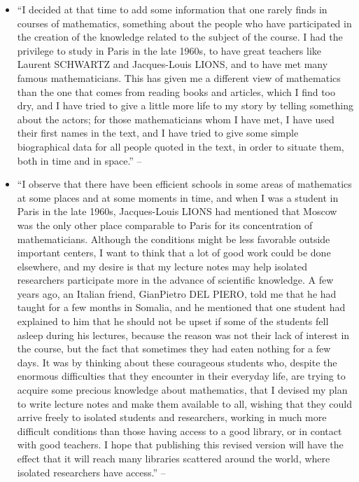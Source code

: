 \documentclass[oneside]{book}
\numberwithin{equation}{section}
\begin{document}
\begin{enumerate}
\begin{itemize}
		\item ``I decided at that time to add some information that one rarely finds in courses of mathematics, something about the people who have participated in the creation of the knowledge related to the subject of the course. I had the privilege to study in Paris in the late 1960s, to have great teachers like Laurent SCHWARTZ and Jacques-Louis LIONS, and to have met many famous mathematicians. This has given me a different view of mathematics than the one that comes from reading books and articles, which I find too dry, and I have tried to give a little more life to my story by telling something about the actors; for those mathematicians whom I have met, I have used their first names in the text, and I have tried to give some simple biographical data for all people quoted in the text, in order to situate them, both in time and in space.'' -- \cite[Preface, p. x]{Tartar2006}
		\item ``I observe that there have been efficient schools in some areas of mathematics at some places and at some moments in time, and when I was a student in Paris in the late 1960s, Jacques-Louis LIONS had mentioned that Moscow was the only other place comparable to Paris for its concentration of mathematicians. Although the conditions might be less favorable outside important centers, I want to think that a lot of good work could be done elsewhere, and my desire is that my lecture notes may help isolated researchers participate more in the advance of scientific knowledge. A few years ago, an Italian friend, GianPietro DEL PIERO, told me that he had taught for a few months in Somalia, and he mentioned that one student had explained to him that he should not be upset if some of the students fell asleep during his lectures, because the reason was not their lack of interest in the course, but the fact that sometimes they had eaten nothing for a few days. It was by thinking about these courageous students who, despite the enormous difficulties that they encounter in their everyday life, are trying to acquire some precious knowledge about mathematics, that I devised my plan to write lecture notes and make them available to all, wishing that they could arrive freely to isolated students and researchers, working in much more difficult conditions than those having access to a good library, or in contact with good teachers. I hope that publishing this revised version will have the effect that it will reach many libraries scattered around the world, where isolated researchers have access.'' -- \cite[Preface, p. xi]{Tartar2006}

\end{itemize}
\end{enumerate}
\end{document}
